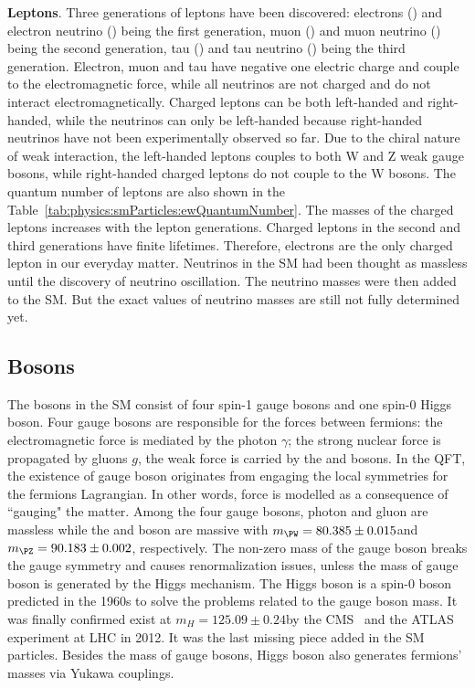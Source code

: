 \textbf{Leptons}. Three generations of leptons have been discovered: electrons (\Pe) and electron neutrino (\PGne) being the first generation, muon (\PGm) and muon neutrino (\PGnGm) being the second generation, tau (\PGt) and tau neutrino (\PGnGt) being the third generation. Electron, muon and tau have negative one electric charge and couple to the electromagnetic force, while all neutrinos are not charged and do not interact electromagnetically. Charged leptons can be both left-handed and right-handed, while the neutrinos can only be left-handed because right-handed neutrinos have not been experimentally observed so far. Due to the chiral nature of weak interaction, the left-handed leptons couples to both W and Z weak gauge bosons, while right-handed charged leptons do not couple to the W bosons. The quantum number of leptons are also shown in the Table~\ref{tab:physics:smParticles:ewQuantumNumber}. The masses of the charged leptons increases with the lepton generations. Charged leptons in the second and third generations have finite lifetimes. Therefore, electrons are the only charged lepton in our everyday matter. Neutrinos in the SM had been thought as massless until the discovery of neutrino oscillation. The neutrino masses were then added to the SM. But the exact values of neutrino masses are still not fully determined yet. 




\subsection{Bosons}
\label{sec:physics:smParticles:bosons}

The bosons in the SM consist of four spin-1 gauge bosons and one spin-0 Higgs boson. Four gauge bosons are responsible for the forces between fermions: the electromagnetic force is mediated by the photon $\gamma$; the strong nuclear force is propagated by gluons $g$, the weak force is carried by the \PW and \PZ bosons. In the QFT, the existence of gauge boson originates from engaging the local symmetries for the fermions Lagrangian. In other words, force is modelled as a consequence of ``gauging" the matter. Among the four gauge bosons, photon and gluon are massless while the \PW and \PZ boson are massive with $m_\PW = 80.385\pm0.015$\GeV and $m_\PZ = 90.183\pm 0.002$\GeV \cite{pdg2020}, respectively. The non-zero mass of the gauge boson breaks the gauge symmetry and causes renormalization issues, unless the mass of gauge boson is generated by the Higgs mechanism. The Higgs boson is a spin-0 boson predicted in the 1960s to solve the problems related to the gauge boson mass. It was finally confirmed exist at $m_H=125.09\pm 0.24$\GeV by the CMS~\cite{Chatrchyan:2012ufa} and the ATLAS~\cite{Aad:2012tfa} experiment at LHC in 2012. It was the last missing piece added in the SM particles. Besides the mass of gauge bosons, Higgs boson also generates fermions' masses via Yukawa couplings.

